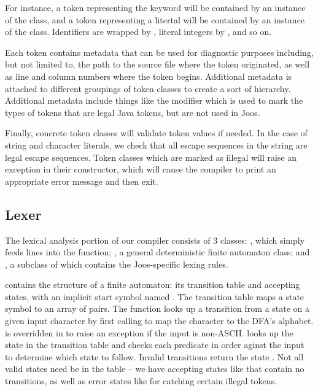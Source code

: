 \documentclass[pdftex,11pt,a4paper]{article}
\begin{document}
For instance, a token representing the keyword  will
be contained by an instance of the  class, and
a token representing a litertal  will be contained by an
instance of the  class. Identifiers are wrapped
by , literal integers by
, and so on.

Each token contains metadata that can be used for diagnostic purposes
including, but not limited to, the path to the source file where the
token originated, as well as line and column numbers where the token
begins. Additional metadata is attached to different groupings of token classes to create
a sort of hierarchy. Additional metadata include things like the
 modifier which is used to mark the types of tokens
that are legal Java tokens, but are not used in Joos.

Finally, concrete token classes will validate token values if
needed. In the case of string and character literals, we check that
all escape sequences in the string are legal escape sequences. Token
classes which are marked as illegal will raise an exception in their
constructor, which will cause the compiler to print an appropriate
error message and then exit.


\subsection{Lexer}

The lexical analysis portion of our compiler consists of 3 classes: 
, which simply feeds lines into the 
function; , a general deterministic finite automaton class;
and , a subclass of  which contains the
Joos-specific lexing rules.

 contains the structure of a finite automaton: its
transition table and accepting states, with an implicit start symbol
named . The transition table maps a state symbol to an
array of  pairs. The  function
looks up a transition from a state on a given input character by
first calling  to map the character to the DFA's alphabet.
 is overridden in  to raise an exception
if the input is non-ASCII.  looks up the state in the
transition table and checks each predicate in order aginst the input
to determine which state to follow. Invalid transitions return the
state . Not all valid states need be in the table --
we have accepting states like  that contain
no transitions, as well as error states like  for
catching certain illegal tokens.
\end{document}
